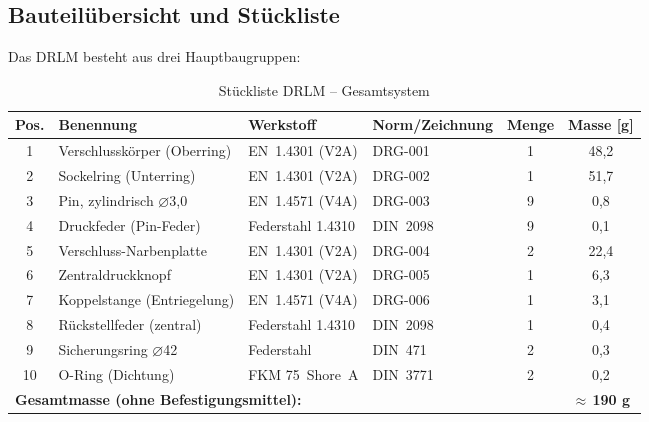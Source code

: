 ﻿\documentclass[12pt, a4paper]{article}
\theoremstyle{remark}
\begin{document}
\subsection{Bauteilübersicht und Stückliste}

Das DRLM besteht aus drei Hauptbaugruppen:

\begin{table}
  \centering
  \caption{Stückliste DRLM -- Gesamtsystem}
  \label{tab:stueckliste}
  \renewcommand{\arraystretch}{1.3}
  \begin{tabular}{clllcc}
    \toprule
    \textbf{Pos.} & \textbf{Benennung} & \textbf{Werkstoff} & \textbf{Norm/Zeichnung} & \textbf{Menge} & \textbf{Masse [g]} \\
    \midrule
    1  & Verschlusskörper (Oberring)    & EN~1.4301 (V2A)       & DRG-001 & 1  & 48{,}2 \\
    2  & Sockelring (Unterring)         & EN~1.4301 (V2A)       & DRG-002 & 1  & 51{,}7 \\
    3  & Pin, zylindrisch $\varnothing$3{,}0    & EN~1.4571 (V4A)       & DRG-003 & 9  &  0{,}8 \\
    4  & Druckfeder (Pin-Feder)         & Federstahl 1.4310     & DIN~2098 & 9  &  0{,}1 \\
    5  & Verschluss-Narbenplatte        & EN~1.4301 (V2A)       & DRG-004 & 2  & 22{,}4 \\
    6  & Zentraldruckknopf              & EN~1.4301 (V2A)       & DRG-005 & 1  &  6{,}3 \\
    7  & Koppelstange (Entriegelung)    & EN~1.4571 (V4A)       & DRG-006 & 1  &  3{,}1 \\
    8  & Rückstellfeder (zentral)       & Federstahl 1.4310     & DIN~2098 & 1  &  0{,}4 \\
    9  & Sicherungsring $\varnothing$42        & Federstahl            & DIN~471  & 2  &  0{,}3 \\
    10 & O-Ring (Dichtung)              & FKM 75~Shore~A        & DIN~3771 & 2  &  0{,}2 \\
    \midrule
    \multicolumn{5}{l}{\textbf{Gesamtmasse (ohne Befestigungsmittel):}} & \textbf{$\approx$\,190 g} \\
    \bottomrule
  \end{tabular}
\end{table}

\end{document}
